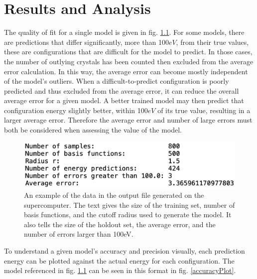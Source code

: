 \chapter{Results and Analysis}\label{Sect:results}
\par The quality of fit for a single model is given in fig. \ref{outputExample}. For some models, there are predictions that differ significantly, more than 100$eV$, from their true values, these are configurations that are difficult for the model to predict. In those cases, the number of outlying crystals has been counted then excluded from the average error calculation. In this way, the average error can become mostly independent of the model's outliers. When a difficult-to-predict configuration is poorly predicted and thus excluded from the average error, it can reduce the overall average error for a given model. A better trained model may then predict that configuration energy slightly better, within 100$eV$ of its true value, resulting in a larger average error. Therefore the average error and number of large errors must both be considered when assessing the value of the model. 

\begin{figure}%
\centering
\includegraphics[scale = 0.6]{Figures/outputExample}
\caption{An example of the data in the output file generated on the supercomputer. The text gives the size of the training set, number of basis functions, and the cutoff radius used to generate the model. It also tells the size of the holdout set, the average error, and the number of errors larger than 100eV.
\label{outputExample}} 
\end{figure}

\par To understand a given model's accuracy and precision visually, each prediction energy can be plotted against the actual energy for each configuration. The model referenced in fig. \ref{outputExample} can be seen in this format in fig. \ref{accuracyPlot}.

